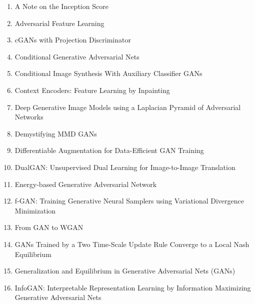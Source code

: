 \documentclass[acmlarge]{acmart}
\begin{document}
\begin{enumerate}
	\item A Note on the Inception Score \cite{barratt2018note} 

	\item Adversarial Feature Learning \cite{donahue2016adversarial} 

	\item cGANs with Projection Discriminator \cite{miyato2018cgans} 

	\item Conditional Generative Adversarial Nets \cite{mirza2014conditional} 

	\item Conditional Image Synthesis With Auxiliary Classifier GANs \cite{odena2016conditional} 

	\item Context Encoders: Feature Learning by Inpainting \cite{pathak2016context} 

	\item Deep Generative Image Models using a Laplacian Pyramid of Adversarial Networks \cite{denton2015deep} 

	\item Demystifying MMD GANs \cite{bikowski2018demystifying} 

	\item Differentiable Augmentation for Data-Efficient GAN Training \cite{zhao2020differentiable} 

	\item DualGAN: Unsupervised Dual Learning for Image-to-Image Translation \cite{yi2017dualgan} 

	\item Energy-based Generative Adversarial Network \cite{zhao2016energybased} 

	\item f-GAN: Training Generative Neural Samplers using Variational Divergence Minimization \cite{nowozin2016fgan} 

	\item From GAN to WGAN \cite{weng2019gan} 

	\item GANs Trained by a Two Time-Scale Update Rule Converge to a Local Nash Equilibrium \cite{heusel2017gans} 

	\item Generalization and Equilibrium in Generative Adversarial Nets (GANs) \cite{arora2017generalization} 

	\item InfoGAN: Interpretable Representation Learning by Information Maximizing Generative Adversarial Nets \cite{chen2016infogan} 


\end{enumerate}
\end{document}
